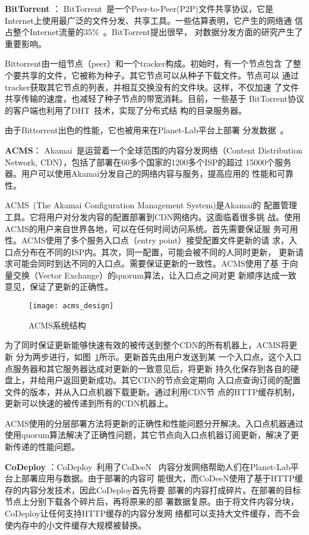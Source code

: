 \textbf{BitTorrent} ：
BitTorrent~\cite{bittorrent}是一个Peer-to-Peer(P2P)文件共享协议，它是
Internet上使用最广泛的文件分发、共享工具。一些估算表明，它产生的网络通
信占整个Internet流量的35\%~\cite{bt2004}。BitTorrent提出很早，
对数据分发方面的研究产生了重要影响。

Bittorrent由一组节点（peer）和一个tracker构成。初始时，有一个节点包含
了整个要共享的文件，它被称为种子。其它节点可以从种子下载文件。节点可以
通过tracker获取其它节点的列表，并相互交换没有的文件块。这样，不仅加速
了文件共享传输的速度，也减轻了种子节点的带宽消耗。目前，一些基于
BitTorrent协议的客户端也利用了DHT~\cite{kademlia}技术，实现了分布式结
构的目录服务器。

由于Bittorrent出色的性能，它也被用来在Planet-Lab平台上部署
分发数据~\cite{plDist}。

\textbf{ACMS}：
Akamai~\cite{akamai}是运营着一个全球范围的内容分发网络（Content
Distribution Network, CDN），包括了部署在60多个国家的1200多个ISP的超过
15000个服务器。用户可以使用Akamai分发自己的网络内容与服务，提高应用的
性能和可靠性。

ACMS~\cite{acms}(The Akamai Configuration Management System)是Akamai的
配置管理工具。它将用户对分发内容的配置部署到CDN网络内。这面临着很多挑
战。使用ACMS的用户来自世界各地，可以在任何时间访问系统。首先需要保证服
务可用性。ACMS使用了多个服务入口点（entry point）接受配置文件更新的请
求，入口点分布在不同的ISP内。其次，同一配置，可能会被不同的人同时更新，
更新请求可能会同时到达不同的入口点。需要保证更新的一致性。ACMS使用了基
于向量交换（Vector Exchange）的quorum算法，让入口点之间对更
新顺序达成一致意见，保证了更新的正确性。

\begin{figure}
\centering
\texttt{[image: acms\_design]}
\caption{ACMS系统结构}
\label{fig:acms_design}
\end{figure}


为了同时保证更新能够快速有效的被传送到整个CDN的所有机器上，ACMS将更新
分为两步进行，如图~\ref{fig:acms_design}所示。更新首先由用户发送到某
一个入口点，这个入口点服务器和其它服务器达成对更新的一致意见后，将更新
持久化保存到各自的硬盘上，并给用户返回更新成功。其它CDN的节点会定期向
入口点查询订阅的配置文件的版本，并从入口点机器下载更新。通过利用CDN节
点的HTTP缓存机制，更新可以快速的被传递到所有的CDN机器上。

ACMS使用的分层部署方法将更新的正确性和性能问题分开解决。入口点机器通过
使用quorum算法解决了正确性问题，其它节点向入口点机器订阅更新，解决了更
新传递的性能问题。

\textbf{CoDeploy} ：CoDeploy~\cite{codeploy}利用了CoDeeN~\cite{codeen}
内容分发网络帮助人们在Planet-Lab平台上部署应用与数据。由于部署的内容可
能很大，而CoDeeN使用了基于HTTP缓存的内容分发技术，因此CoDeploy首先将要
部署的内容打成碎片。在部署的目标节点上分别下载各个碎片后，再将原来的部
署数据复原。由于将文件内容分块，CoDeploy让任何支持HTTP缓存的内容分发网
络都可以支持大文件缓存，而不会使内存中的小文件缓存大规模被替换。

